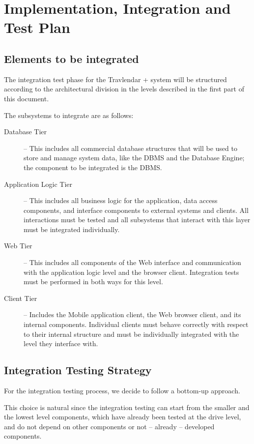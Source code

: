 \documentclass{article}
\begin{document}
	\section{Implementation, Integration and Test Plan}


	\subsection{Elements to be integrated}
	The integration test phase for the Travlendar + system will be structured according to the architectural division in the levels described in the first part of this document.
	
	The subsystems to integrate are as follows:
	\begin{description}
	\item [Database Tier] -- This includes all commercial database structures that will be used to store and manage system data, like the DBMS and the Database Engine; the component to be integrated is the DBMS.
	\item [Application Logic Tier] -- This includes all business logic for the application, data access components, and interface components to external systems and clients. All interactions must be tested and all subsystems that interact with this layer must be integrated individually.
	\item [Web Tier] -- This includes all components of the Web interface and communication with the application logic level and the browser client. Integration tests must be performed in both ways for this level.
	\item [Client Tier] -- Includes the Mobile application client, the Web browser client, and its internal components. Individual clients must behave correctly with respect to their internal structure and must be individually integrated with the level they interface with.
	\end{description}

	\subsection{Integration Testing Strategy}
	For the integration testing process, we decide to follow a bottom-up approach.
	
	This choice is natural since the integration testing can start from the smaller and the lowest level components, which have already been tested at the drive level, and do not depend on other components or not – already – developed components.
	
\end{document}
